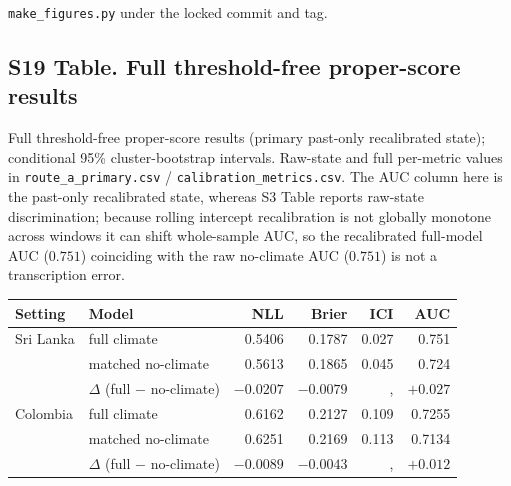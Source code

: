 \documentclass[11pt,a4paper]{article}
\begin{document}
\texttt{make\_figures.py} under the locked commit and tag.

\subsection*{S19 Table. Full threshold-free proper-score results}
\noindent Full threshold-free proper-score results (primary past-only recalibrated state); conditional 95\% cluster-bootstrap intervals. Raw-state and full per-metric values in \texttt{route\_a\_primary.csv} / \texttt{calibration\_metrics.csv}. The AUC column here is the past-only recalibrated state, whereas S3 Table reports raw-state discrimination; because rolling intercept recalibration is not globally monotone across windows it can shift whole-sample AUC, so the recalibrated full-model AUC ($0.751$) coinciding with the raw no-climate AUC ($0.751$) is not a transcription error.\\[0.3em]
{\footnotesize\begin{tabular}{@{}llrrrr@{}}
\toprule
Setting & Model & NLL & Brier & ICI & AUC \\
\midrule
Sri Lanka & full climate & 0.5406 & 0.1787 & 0.027 & 0.751 \\
 & matched no-climate & 0.5613 & 0.1865 & 0.045 & 0.724 \\
 & $\Delta$ (full $-$ no-climate) & $-0.0207$ & $-0.0079$ &, & $+0.027$ \\
Colombia & full climate & 0.6162 & 0.2127 & 0.109 & 0.7255 \\
 & matched no-climate & 0.6251 & 0.2169 & 0.113 & 0.7134 \\
 & $\Delta$ (full $-$ no-climate) & $-0.0089$ & $-0.0043$ &, & $+0.012$ \\
\bottomrule
\end{tabular}}

\endgroup
\end{document}
